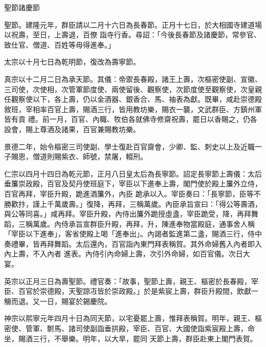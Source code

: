 
\begin{pinyinscope}

 聖節諸慶節



 聖節。建隆元年，群臣請以二月十六日為長春節。正月十七日，於大相國寺建道場以祝壽，至日，上壽退，百僚
 詣寺行香。尋詔：「今後長春節及諸慶節，常參官、致仕官、僧道、百姓等毋得進奉。」



 太宗以十月七日為乾明節，復改為壽寧節。



 真宗以十二月二日為承天節。其儀：帝禦長春殿，諸王上壽，次樞密使副、宣徽、三司使，次使相，次管軍節度使、兩使留後、觀察使，次節度使至觀察使，次皇親任觀察使以下，各上壽，仍以金酒器、銀香合、馬、袖表為獻。既畢，咸赴崇德殿敘班，宰相率百官上壽，賜酒三行，皆用教坊樂，賜衣一襲，文武群臣、方鎮州軍皆有貢
 禮。前一月，百官、內職、牧伯各就佛寺修齋祝壽，罷日以香賜之，仍各設會，賜上尊酒及諸果，百官兼賜教坊樂。



 景德二年，始令樞密三司使副、學士復赴百官齋會，少卿、監、刺史以上及近職一子賜恩，僧道則賜紫衣、師號，禁屠，輟刑。



 仁宗以四月十四日為乾元節，正月八日皇太后為長寧節。詔定長寧節上壽儀：太后垂簾崇政殿，百官及契丹使班庭下，宰臣以下進奉上壽，閣門使於殿上簾外立侍，百官再拜，宰臣升殿，跪進酒簾外，內臣
 跪承以入。宰臣奏曰：「長寧節，臣等不勝歡抃，謹上千萬歲壽。」復降，再拜，三稱萬歲。內臣承旨宣曰：「得公等壽酒，與公等同喜。」咸再拜。宰臣升殿，內侍出簾外跪授虛盞，宰臣跪受，降，再拜舞蹈，三稱萬歲。內侍承旨宣群臣升殿，再拜，升，陳進奉物當殿庭，通事舍人稱「宰臣以下進奉」，客省使殿上喝「進奉出」。內謁者監進第二盞，賜酒三行，侍中奏禮畢，皆再拜舞蹈。太后還內，百官詣內東門拜表稱賀。其外命婦舊入內者即入內上壽，不入內者
 進表。內侍引內命婦上壽，次引外命婦，如百官儀。次日大宴。



 英宗以正月三日為壽聖節。禮官奏：「故事，聖節上壽，親王、樞密於長春殿，宰臣、百官於崇德殿，天聖諒冱皆於崇政殿。」於是紫宸上壽，群臣升殿間，飲獻一觴而退。又一日，賜宴於錫慶院。



 神宗以熙寧元年四月十日為同天節，以宅憂罷上壽，惟拜表稱賀。明年，親王、樞密使、管軍、駙馬、諸司使副詣垂拱殿，宰臣、百官、大國使詣紫宸殿上壽，命坐，賜酒三行，不舉樂。明年，以大旱，罷同
 天節上壽，群臣赴東上閣門表賀。




\end{pinyinscope}
